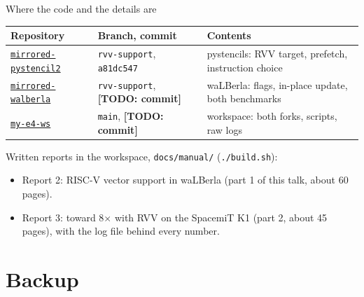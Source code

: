 \documentclass[aspectratio=169,10pt,t]{beamer}
\newcommand{\sx}[1]{#1\ensuremath{\times}} %
\newcommand{\code}[1]{\texttt{#1}}
\newif\ifshowtodos \showtodostrue
\newcommand{\todo}[1]{\ifshowtodos{\scriptsize\textcolor{psred}{\textbf{[TODO: #1]}}}\fi}
\begin{document}
\begin{frame}{Where the code and the details are}
  \vspace{1mm}
  \small
  \begin{tabularx}{\textwidth}{@{}l l X@{}}
    \toprule
    Repository & Branch, commit & Contents\\
    \midrule
    \href{https://github.com/salehjg/mirrored-pystencil2/tree/rvv-support}{\code{mirrored-pystencil2}}
      & \code{rvv-support}, \code{a81dc547} & pystencils: RVV target, prefetch, instruction choice\\
    \href{https://github.com/salehjg/mirrored-walberla/tree/rvv-support}{\code{mirrored-walberla}}
      & \code{rvv-support}, \todo{commit} & waLBerla: flags, in-place update, both benchmarks\\
    \href{https://github.com/salehjg/my-e4-ws}{\code{my-e4-ws}} & \code{main}, \todo{commit}
      & workspace: both forks, scripts, raw logs\\
    \bottomrule
  \end{tabularx}

  \vspace{4mm}
  Written reports in the workspace, \code{docs/manual/} (\code{./build.sh}):
  \begin{itemize}\small
    \item Report 2: RISC-V vector support in waLBerla (part 1 of this talk, about 60 pages).
    \item Report 3: toward \sx{8} with RVV on the SpacemiT K1 (part 2, about 45 pages), with
          the log file behind every number.
  \end{itemize}
  \vfill
  \vspace{2mm}
\end{frame}

\appendix
\section{Backup}
\end{document}
